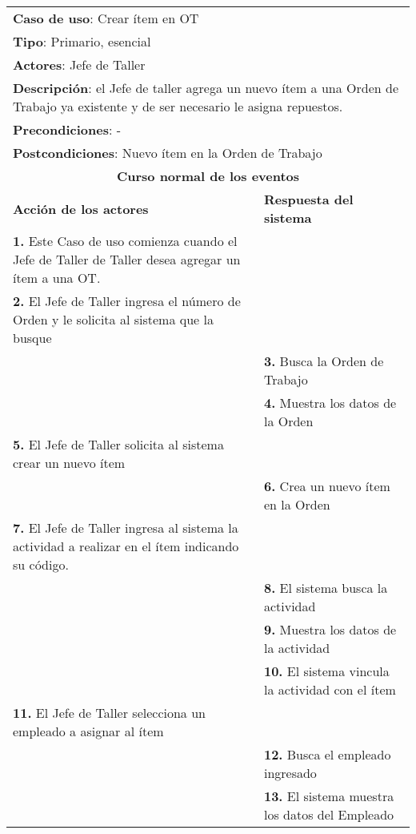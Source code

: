 	\begin{longtable}{ |p{8cm}|p{8cm}| }
		\hline
		\multicolumn{2}{|p{16cm}|}{\textbf{Caso de uso}: Crear ítem en OT}\\
		\multicolumn{2}{|p{16cm}|}{\textbf{Tipo}: Primario, esencial}\\
		\multicolumn{2}{|p{16cm}|}{\textbf{Actores}: Jefe de Taller}\\
		\multicolumn{2}{|p{16cm}|}{\textbf{Descripción}: el Jefe de taller agrega un nuevo ítem a una Orden de Trabajo ya existente y de ser necesario le asigna repuestos.}\\
		\multicolumn{2}{|p{16cm}|}{\textbf{Precondiciones}: -}\\
		\multicolumn{2}{|p{16cm}|}{\textbf{Postcondiciones}: Nuevo ítem en la Orden de Trabajo}\\
		\hline
		\multicolumn{2}{|c|}{\textbf{Curso normal de los eventos}}\\
		\hline
		\textbf{Acción de los actores} & \textbf{Respuesta del sistema}\\
		\hline
			\textbf{1. }Este Caso de uso comienza cuando el Jefe de Taller de Taller desea agregar un ítem a una OT. & \\
			\hline
			\textbf{2. }El Jefe de Taller ingresa el número de Orden y le solicita al sistema que la busque &  \\
			\hline
			& \textbf{3. }Busca la Orden de Trabajo \\
			\hline
			& \textbf{4. }Muestra los datos de la Orden \\
			\hline
			\textbf{5. }El Jefe de Taller solicita al sistema crear un nuevo ítem & \\
			\hline
			& \textbf{6. }Crea un nuevo ítem en la Orden\\
			\hline
			\textbf{7. }El Jefe de Taller ingresa al sistema la actividad a realizar en el ítem indicando su código. & \\
			\hline
			& \textbf{8. }El sistema busca la actividad \\
			\hline
			& \textbf{9. }Muestra los datos de la actividad \\
			\hline
			& \textbf{10. }El sistema vincula la actividad con el ítem \\
			\hline
			\textbf{11. }El Jefe de Taller selecciona un empleado a asignar al ítem & \\
			\hline
			& \textbf{12. }Busca el empleado ingresado  \\
			\hline
			& \textbf{13. }El sistema muestra los datos del Empleado \\

\end{longtable}
